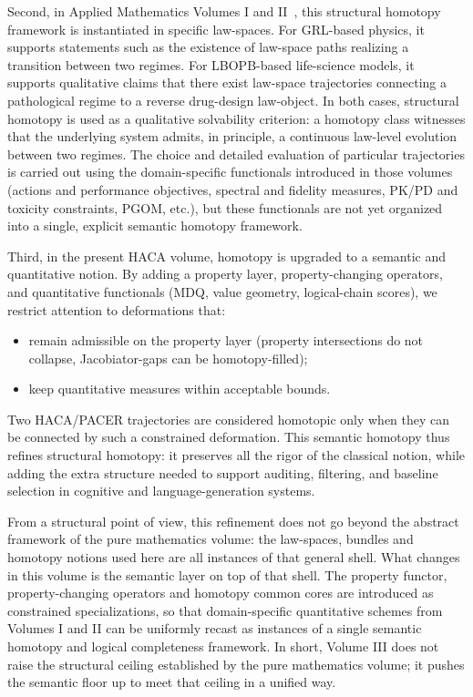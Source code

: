 \documentclass[11pt]{book}
\theoremstyle{plain}
\theoremstyle{definition}
\theoremstyle{remark}
\begin{document}
Second, in Applied Mathematics Volumes I and II~\cite{GaoZhengAppVol1,GaoZhengAppVol2}, this structural homotopy
framework is instantiated in specific law-spaces. For GRL-based physics,
it supports statements such as the existence of law-space paths realizing a
transition between two regimes. For LBOPB-based life-science models, it
supports qualitative claims that there exist law-space trajectories
connecting a pathological regime to a reverse drug-design law-object. In
both cases, structural homotopy is used as a qualitative solvability
criterion: a homotopy class witnesses that the underlying system admits, in
principle, a continuous law-level evolution between two regimes. The choice
and detailed evaluation of particular trajectories is carried out using the
domain-specific functionals introduced in those volumes (actions and
performance objectives, spectral and fidelity measures, PK/PD and toxicity
constraints, PGOM, etc.), but these functionals are not yet organized into
a single, explicit semantic homotopy framework.

Third, in the present HACA volume, homotopy is upgraded to a semantic and
quantitative notion. By adding a property layer, property-changing
operators, and quantitative functionals (MDQ, value geometry, logical-chain
scores), we restrict attention to deformations that:
\begin{itemize}
  \item remain admissible on the property layer (property intersections
        do not collapse, Jacobiator-gaps can be homotopy-filled);
  \item keep quantitative measures within acceptable bounds.
\end{itemize}
Two HACA/PACER trajectories are considered homotopic only when they can be
connected by such a constrained deformation. This semantic homotopy thus
refines structural homotopy: it preserves all the rigor of the classical
notion, while adding the extra structure needed to support auditing,
filtering, and baseline selection in cognitive and language-generation
systems.

From a structural point of view, this refinement does not go beyond the
abstract framework of the pure mathematics volume: the law-spaces, bundles
and homotopy notions used here are all instances of that general shell. What
changes in this volume is the semantic layer on top of that shell. The
property functor, property-changing operators and homotopy common cores are
introduced as constrained specializations, so that domain-specific quantitative
schemes from Volumes I and II can be uniformly recast as instances of a single
semantic homotopy and logical completeness framework. In short, Volume III
does not raise the structural ceiling established by the pure mathematics
volume; it pushes the semantic floor up to meet that ceiling in a unified way.
\end{document}
